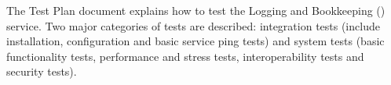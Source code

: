%
%
The Test Plan document explains how to test the Logging and Bookkeeping (\LB)
service. Two major categories of tests are described: integration tests
(include installation, configuration and basic service ping tests) and
system tests (basic functionality tests, performance and stress tests,
interoperability tests and security tests). 
